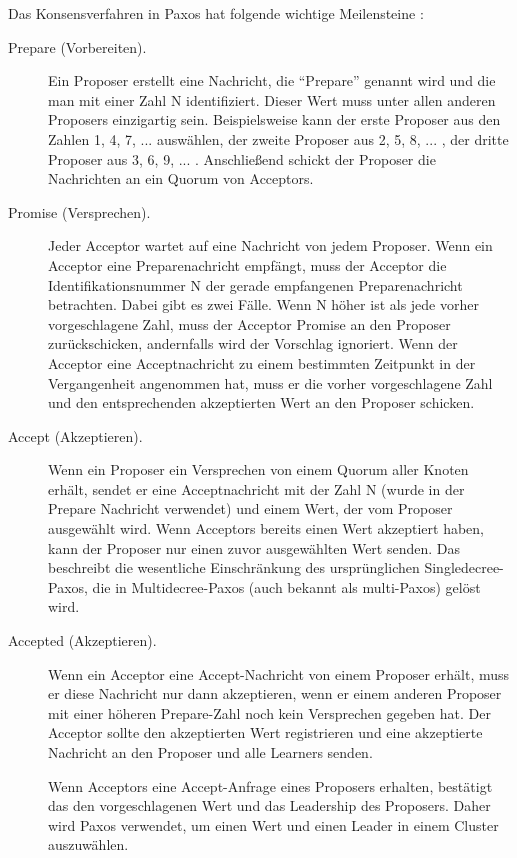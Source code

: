 Das Konsensverfahren in Paxos hat folgende wichtige Meilensteine \cite{Lamport2001paxos-made-simple}:

\begin{description} 
	\item[Prepare (Vorbereiten).] Ein Proposer erstellt eine Nachricht, die “Prepare” genannt wird und die man mit einer Zahl N identifiziert. Dieser Wert muss unter allen anderen Proposers einzigartig sein. Beispielsweise kann der erste Proposer aus den Zahlen 1, 4, 7, ... auswählen, der zweite Proposer aus 2, 5, 8, ... , der dritte Proposer aus 3, 6, 9, ... . Anschließend schickt der Proposer die Nachrichten an ein Quorum von Acceptors.
	
	\item[Promise (Versprechen).] Jeder Acceptor wartet auf eine Nachricht von jedem Proposer. Wenn ein Acceptor eine Preparenachricht empfängt, muss der Acceptor die Identifikationsnummer N der gerade empfangenen Preparenachricht betrachten. Dabei gibt es zwei Fälle. Wenn N höher ist als jede vorher vorgeschlagene Zahl, muss der Acceptor Promise an den Proposer zurückschicken, andernfalls wird der Vorschlag ignoriert. Wenn der Acceptor eine Acceptnachricht zu einem bestimmten Zeitpunkt in der Vergangenheit angenommen hat, muss er die vorher vorgeschlagene Zahl und den entsprechenden akzeptierten Wert an den Proposer schicken.
	
	\item[Accept (Akzeptieren).] Wenn ein Proposer ein Versprechen von einem Quorum aller Knoten erhält, sendet er eine Acceptnachricht mit der Zahl N (wurde in der Prepare Nachricht verwendet) und einem Wert, der vom Proposer ausgewählt wird. Wenn Acceptors bereits einen Wert akzeptiert haben, kann der Proposer nur einen zuvor ausgewählten Wert senden. Das beschreibt die wesentliche Einschränkung des ursprünglichen Singledecree-Paxos, die in Multidecree-Paxos (auch bekannt als multi-Paxos) gelöst wird.

	\item[Accepted (Akzeptieren).] Wenn ein Acceptor eine Accept-Nachricht von einem Proposer erhält, muss er diese Nachricht nur dann akzeptieren, wenn er einem anderen Proposer mit einer höheren Prepare-Zahl noch kein Versprechen gegeben hat. Der Acceptor sollte den akzeptierten Wert registrieren und eine akzeptierte Nachricht an den Proposer und alle Learners senden.

	Wenn Acceptors eine Accept-Anfrage eines Proposers erhalten, bestätigt das den vorgeschlagenen Wert und das Leadership des Proposers. Daher wird Paxos verwendet, um einen Wert und einen Leader in einem Cluster auszuwählen.
\end{description}

